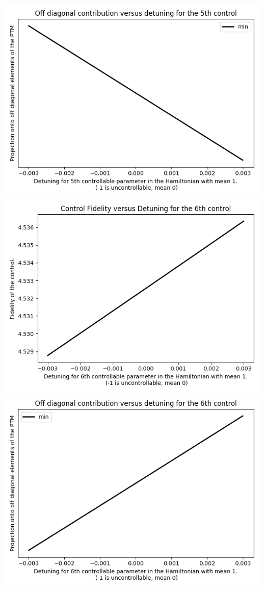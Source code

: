 \documentclass{article}
\begin{document}
\begin{center}
\includegraphics[scale=.9]{off_diag_6}
\includegraphics[scale=.9]{control_fid_7}
\includegraphics[scale=.9]{off_diag_7}

\end{center}
\end{document}
